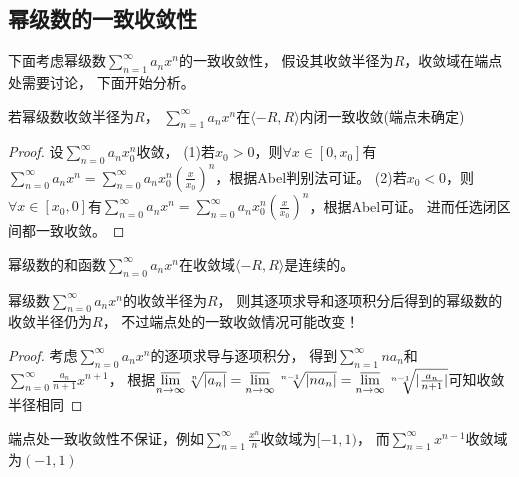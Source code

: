 \subsection{幂级数的一致收敛性}

下面考虑幂级数$\sum\limits_{n = 1}^{\infty}a_nx^n$的一致收敛性，
假设其收敛半径为$R$，收敛域在端点处需要讨论，
下面开始分析。

\begin{theorem}[Abel第二定理]
  若幂级数收敛半径为$R$，
 $\sum\limits_{n = 1}^{\infty}a_nx^n$在$\langle - R, R \rangle $内闭一致收敛(端点未确定)
\end{theorem}

\begin{proof}
  设$\sum\limits_{n = 0}^{\infty}a_nx^n_0$收敛，
  (1)若$x_0 > 0$，则$\forall x \in [0,x_0]$有$\sum\limits_{n = 0}^{\infty}a_nx^n = \sum\limits_{n = 0}^{\infty}a_nx_0^n \left( \frac{x}{x_0} \right)^n$，根据Abel判别法可证。
  (2)若$x_0 < 0$，则$\forall x \in [x_0,0]$有$\sum\limits_{n = 0}^{\infty}a_nx^n = \sum\limits_{n = 0}^{\infty}a_nx_0^n \left( \frac{x}{x_0} \right)^n$，根据Abel可证。
  进而任选闭区间都一致收敛。
\end{proof}


\begin{theorem}[连续性]
  幂级数的和函数$\sum\limits_{n = 0}^{\infty}a_nx^n$在收敛域$\langle -R, R\rangle$是连续的。
\end{theorem}


\begin{theorem}[区间不变性]
  幂级数$\sum\limits_{n = 0}^{\infty}a_nx^n$的收敛半径为$R$，
  则其逐项求导和逐项积分后得到的幂级数的收敛半径仍为$R$，
  不过端点处的一致收敛情况可能改变！
\end{theorem}

\begin{proof}
  考虑$\sum\limits_{n = 0}^{\infty}a_nx^n$的逐项求导与逐项积分，
  得到$\sum\limits_{n = 1}^{\infty}na_n$和$\sum\limits_{n = 0}^{\infty}\frac{a_n}{n+1}x^{n+1}$，
  根据$\varlimsup \limits _{n \rightarrow \infty} \sqrt[n]{|a_n|} = \varlimsup \limits_{n \rightarrow \infty}\sqrt[n-1]{|na_n|} = \varlimsup \limits_{n \rightarrow \infty}\sqrt[n-1]{|\frac{a_n}{n+1}|}$可知收敛半径相同
\end{proof}

\begin{note}
  端点处一致收敛性不保证，例如$\sum\limits_{n = 1}^{\infty}\frac{x^n}{n}$收敛域为$[-1,1)$，
  而$\sum\limits_{n = 1}^{\infty}x^{n-1}$收敛域为$(-1,1)$
\end{note}

